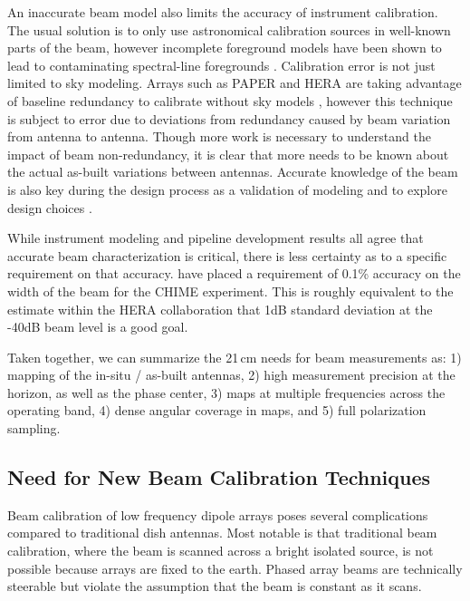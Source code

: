 \documentclass[preprint2,numberedappendix,tighten,twocolappendix]{aastex6}
\begin{document}
An inaccurate beam model also limits the accuracy of instrument calibration. The usual solution is to only use astronomical calibration sources in well-known parts of the beam, however incomplete foreground models have been shown to lead to contaminating spectral-line foregrounds \citep{2016:BarryCalibrationRequirements}.  Calibration error is not just limited to sky modeling.  Arrays such as PAPER and HERA are taking advantage of baseline redundancy to calibrate without sky models \citep{Liu:2010p10391,Zheng:2014p10467,2015ApJ...809...61A}, however this technique is subject to error due to deviations from redundancy caused by beam variation from antenna to antenna. Though more work is necessary to understand the impact of beam non-redundancy, it is clear that more needs to be known about the actual as-built variations between antennas.  Accurate knowledge of the beam is also key during the design process as a validation of modeling and to explore design choices \citep{2014IAWPL..13..169V,2016:NebenHERAdish}. 

While instrument modeling and pipeline development results all agree that accurate beam characterization is critical, there is less certainty as to a specific requirement on that accuracy.  \citet{Shaw2015_chimemmodes} have placed a requirement of 0.1\% accuracy on the width of the beam for the CHIME experiment. This is roughly equivalent to the estimate within the HERA collaboration that 1dB standard deviation at the -40dB beam level is a good goal.

Taken together, we can summarize the 21\,cm needs for beam measurements as: 1) mapping of the in-situ / as-built antennas, 2) high measurement precision at the horizon, as well as the phase center, 3) maps at multiple frequencies across the operating band, 4) dense angular coverage in maps, and 5) full polarization sampling.

\subsection{Need for New Beam Calibration Techniques}

Beam calibration of low frequency dipole arrays poses several complications compared to traditional dish antennas. Most notable is that traditional beam calibration, where the beam is scanned across a bright isolated source, is not possible because arrays are fixed to the earth. Phased array beams are technically steerable but violate the assumption that the beam is constant as it scans. 
\end{document}
